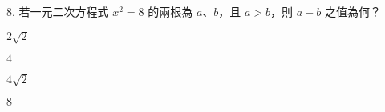 \documentclass[12pt]{article}
\begin{document}
\begin{problem}
  \item[8.] 若一元二次方程式 $x^2 = 8$ 的兩根為 $a$、$b$，且 $a > b$，則 $a - b$ 之值為何？
  \begin{choices}
    \item $2\sqrt{2}$
    \item $4$
    \item $4\sqrt{2}$
    \item $8$
  \end{choices}
\end{problem}
\end{document}
